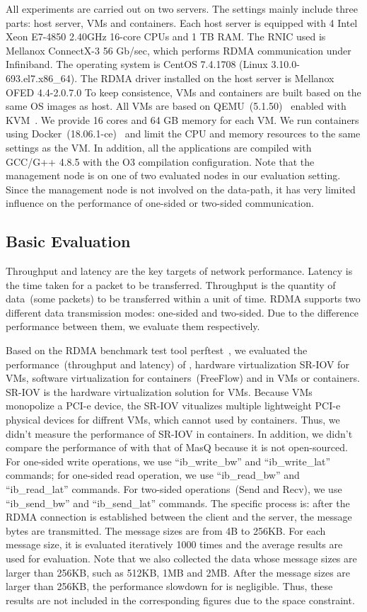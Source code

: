 All experiments are carried out on two servers. The settings mainly include three parts: host server, VMs and containers. 
Each host server is equipped with 4 Intel Xeon E7-4850 2.40GHz 16-core CPUs and 1 TB RAM. The RNIC used is Mellanox ConnectX-3 56 Gb/sec, which performs RDMA communication under Infiniband.  The operating system is CentOS 7.4.1708 (Linux 3.10.0-693.el7.x86\_64). The RDMA driver installed on the host server is Mellanox OFED 4.4-2.0.7.0%
To keep consistence, VMs and containers are built based on the same OS images as host. All VMs are based on QEMU~(5.1.50)~\cite{qemu} enabled with KVM~\cite{kvm}. We provide 16 cores and 64 GB memory for each VM. We run containers using Docker~(18.06.1-ce)~\cite{docker} and limit the CPU and memory resources to the same settings as the VM. In addition, all the applications are compiled with GCC/G++ 4.8.5 with the O3 compilation configuration. Note that the management node is on one of two evaluated nodes in our evaluation setting. Since the management node is not involved on the data-path, it has very limited influence on the performance of one-sided or two-sided communication.


\subsection{Basic Evaluation}

Throughput and latency are the key targets of network performance. Latency is the time taken for a packet to be transferred. Throughput is the quantity of data~(some packets) to be transferred within a unit of time. RDMA supports two different data transmission modes: one-sided and two-sided. Due to the difference performance between them, we evaluate them respectively.


Based on the RDMA benchmark test tool perftest~\cite{perftest}, we evaluated the performance~(throughput and latency) of \native, hardware virtualization SR-IOV for VMs,  software virtualization for containers~(FreeFlow) and \sys in VMs or containers. SR-IOV is the hardware virtualization solution for VMs. Because VMs monopolize a PCI-e device, the SR-IOV vitualizes multiple lightweight PCI-e physical devices for diffrent VMs, which cannot used by containers. Thus, we didn't measure the performance of SR-IOV in containers. In addition, we didn't compare the performance of \sys with that of MasQ because it is not open-sourced. For one-sided write operations, we use ``ib\_write\_bw'' and ``ib\_write\_lat'' commands; for one-sided read operation, we use ``ib\_read\_bw'' and ``ib\_read\_lat'' commands. For two-sided operations~(Send and Recv), we use ``ib\_send\_bw'' and ``ib\_send\_lat'' commands. The specific process is: after the RDMA connection is established between the client and the server, the message bytes are transmitted. The message sizes are from 4B to 256KB. For each message size,  it is evaluated iteratively 1000 times and the average results are used for evaluation.  Note that we also collected the data whose message sizes are larger than 256KB, such as 512KB, 1MB and 2MB. After the message sizes are larger than 256KB, the performance slowdown for \sys is negligible. Thus, these results are not included in the corresponding figures due to the space constraint. 



